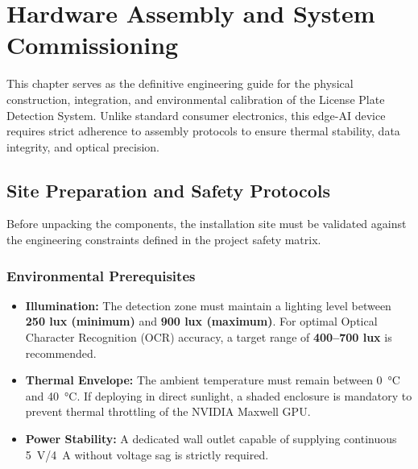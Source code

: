 %
%

\chapter{Hardware Assembly and System Commissioning}

This chapter serves as the definitive engineering guide for the physical construction, integration, and environmental calibration of the License Plate Detection System. Unlike standard consumer electronics, this edge-AI device requires strict adherence to assembly protocols to ensure thermal stability, data integrity, and optical precision.

\section{Site Preparation and Safety Protocols}
Before unpacking the components, the installation site must be validated against the engineering constraints defined in the project safety matrix.

\subsection{Environmental Prerequisites}
\begin{itemize}
	\item \textbf{Illumination:} The detection zone must maintain a lighting level between \textbf{250 lux (minimum)} and \textbf{900 lux (maximum)}. For optimal Optical Character Recognition (OCR) accuracy, a target range of \textbf{400--700 lux} is recommended.
	\item \textbf{Thermal Envelope:} The ambient temperature must remain between \SI{0}{\celsius} and \SI{40}{\celsius}. If deploying in direct sunlight, a shaded enclosure is mandatory to prevent thermal throttling of the NVIDIA Maxwell GPU.
	\item \textbf{Power Stability:} A dedicated wall outlet capable of supplying continuous \SI{5}{\volt}/\SI{4}{\ampere} without voltage sag is strictly required.
\end{itemize}

